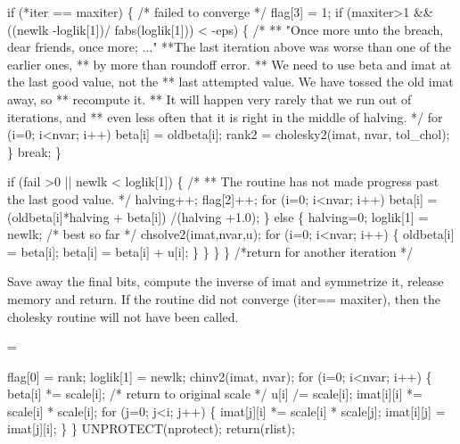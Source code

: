 \documentclass{article}
\begin{document}
\begin{nwchunk}
         if (*iter == maxiter) \{ /* failed to converge */
            flag[3] = 1;  
            if (maxiter>1 && ((newlk -loglik[1])/ fabs(loglik[1])) < -eps) \{
                /* 
                ** "Once more unto the breach, dear friends, once more; ..."
                **The last iteration above was worse than one of the earlier ones,
                **  by more than roundoff error.  
                ** We need to use beta and imat at the last good value, not the
                **  last attempted value. We have tossed the old imat away, so 
                **  recompute it.
                ** It will happen very rarely that we run out of iterations, and
                **  even less often that it is right in the middle of halving.
                */
                for (i=0; i<nvar; i++) beta[i] = oldbeta[i];
                rank2 = cholesky2(imat, nvar, tol_chol);
                \}
            break;
         \}
         
         if (fail >0 || newlk < loglik[1]) \{
             /* 
             ** The routine has not made progress past the last good value.
             */
             halving++; flag[2]++;
             for (i=0; i<nvar; i++)
                 beta[i] = (oldbeta[i]*halving + beta[i]) /(halving +1.0);
         \}
         else \{ 
             halving=0;
             loglik[1] = newlk;   /* best so far */  
             chsolve2(imat,nvar,u);
             for (i=0; i<nvar; i++) \{
                 oldbeta[i] = beta[i];
                 beta[i] = beta[i] +  u[i];
             \}
         \}
     \}
 \} /*return for another iteration */
\end{nwchunk}

Save away the final bits, compute the inverse of imat and symmetrize it,
release memory and return.
If the routine did not converge (iter== maxiter), then the cholesky
routine will not have been called.

\begin{nwchunk}
=
 
 flag[0] = rank; 
 loglik[1] = newlk;
 chinv2(imat, nvar);
 for (i=0; i<nvar; i++) \{
     beta[i] *= scale[i];  /* return to original scale */
     u[i] /= scale[i];
     imat[i][i] *= scale[i] * scale[i];
     for (j=0; j<i; j++) \{
         imat[j][i] *= scale[i] * scale[j];
         imat[i][j] = imat[j][i];
     \}
 \}
 UNPROTECT(nprotect);
 return(rlist);
\end{nwchunk}
\end{document}
